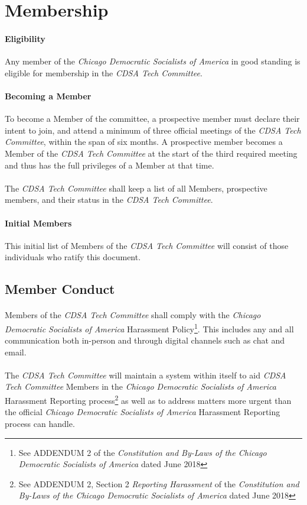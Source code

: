 \documentclass[12pt,letter,twocolumn,oneside,draft]{article}
\newcommand{\cname}{\emph{CDSA Tech Committee}}
\newcommand{\cdsa}{\emph{Chicago Democratic Socialists of America}}
\begin{document}
\section{Membership}

\paragraph{Eligibility}
Any member of the \cdsa{} in good standing is eligible for membership in the
\cname{}.

\paragraph{Becoming a Member}
To become a Member of the committee, a prospective member must declare their
intent to join, and attend a minimum of three official meetings of the
\cname{}, within the span of six months. A prospective member becomes a Member
of the \cname{} at the start of the third required meeting and thus has the
full privileges of a Member at that time.

\paragraph{}
The \cname{} shall keep a list of all Members, prospective members, and their
status in the \cname{}.

\paragraph{Initial Members}
This initial list of Members of the \cname{} will consist of those individuals
who ratify this document.

\subsection{Member Conduct}

\paragraph{}
Members of the \cname{} shall comply with the \cdsa{} Harassment
Policy\footnote{See ADDENDUM 2 of the \emph{Constitution and By-Laws of the
Chicago Democratic Socialists of America} dated June 2018}. This includes any
and all communication both in-person and through digital channels such as chat
and email.

\paragraph{}
The \cname{} will maintain a system within itself to aid \cname{} Members in
the \cdsa{} Harassment Reporting process\footnote{See ADDENDUM 2, Section 2
\emph{Reporting Harassment} of the \emph{Constitution and By-Laws of the
Chicago Democratic Socialists of America} dated June 2018} as well as to
address matters more urgent than the official \cdsa{} Harassment Reporting
process can handle.
\end{document}
